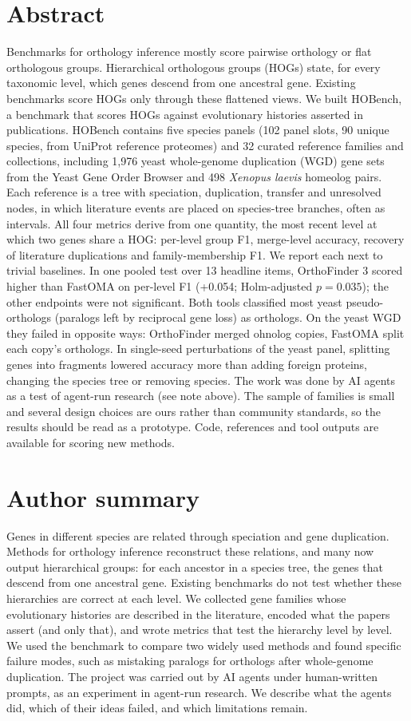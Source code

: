 \section*{Abstract}
Benchmarks for orthology inference mostly score pairwise orthology or flat orthologous groups. Hierarchical
orthologous groups (HOGs) state, for every taxonomic level, which genes descend from one ancestral gene.
Existing benchmarks score HOGs only through these flattened views. We built HOBench, a benchmark that scores HOGs against evolutionary
histories asserted in publications. HOBench contains five species panels (102 panel slots, 90 unique species, from UniProt
reference proteomes) and 32 curated reference families and collections, including 1,976 yeast whole-genome duplication (WGD)
gene sets from the Yeast Gene Order Browser and 498 \textit{Xenopus laevis} homeolog pairs. Each reference is a tree
with speciation, duplication, transfer and unresolved nodes, in which literature events are placed on species-tree
branches, often as intervals. All four metrics derive from one quantity, the most recent level at which two genes
share a HOG: per-level group F1, merge-level accuracy, recovery of literature duplications and family-membership F1.
We report each next to trivial baselines. In one pooled test over 13 headline items, OrthoFinder 3 scored higher than
FastOMA on per-level F1 (+0.054; Holm-adjusted $p=0.035$); the other endpoints were not significant. Both tools
classified most yeast pseudo-orthologs (paralogs left by reciprocal gene loss) as orthologs. On the yeast WGD they
failed in opposite ways: OrthoFinder merged ohnolog copies, FastOMA split each copy's orthologs. In single-seed
perturbations of the yeast panel, splitting genes into fragments lowered accuracy more than adding foreign proteins,
changing the species tree or removing species. The work was done by AI agents as a test of
agent-run research (see note above). The sample of families is small and several design choices are ours rather than
community standards, so the results should be read as a prototype. Code, references and tool outputs are available
for scoring new methods.

\section*{Author summary}
Genes in different species are related through speciation and gene duplication. Methods for orthology inference
reconstruct these relations, and many now output hierarchical groups: for each ancestor in a species tree, the genes
that descend from one ancestral gene. Existing benchmarks do not test whether these hierarchies are correct at each
level. We collected gene families whose evolutionary histories are described in the literature, encoded what the
papers assert (and only that), and wrote metrics that test the hierarchy level by level. We used the benchmark to
compare two widely used methods and found specific failure modes, such as mistaking paralogs for
orthologs after whole-genome duplication. The project was carried out by AI agents under human-written prompts, as
an experiment in agent-run research. We describe what the agents did, which of their ideas failed, and which
limitations remain.

